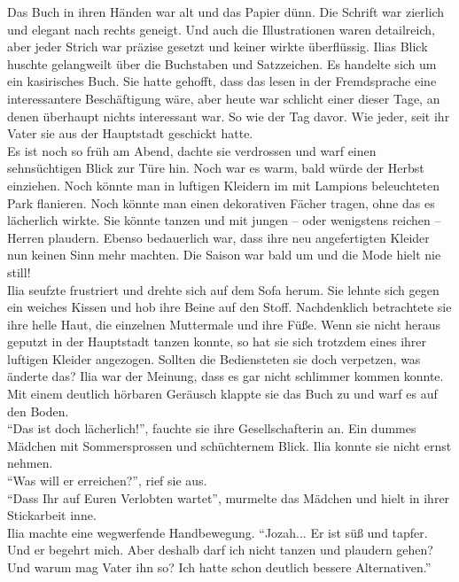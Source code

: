Das Buch in ihren Händen war alt und das Papier dünn. Die Schrift war zierlich 
und elegant nach rechts geneigt. Und auch die Illustrationen waren detailreich, 
aber jeder Strich war präzise gesetzt und keiner wirkte überflüssig. Ilias 
Blick huschte gelangweilt über die Buchstaben und Satzzeichen. Es handelte sich 
um ein kasirisches Buch. Sie hatte gehofft, dass das lesen in der Fremdsprache 
eine interessantere Beschäftigung wäre, aber heute war schlicht einer dieser 
Tage, an denen überhaupt nichts interessant war. So wie der Tag davor. Wie 
jeder, seit ihr Vater sie aus der Hauptstadt geschickt hatte. \\
Es ist noch so früh am Abend, dachte sie verdrossen und warf einen 
sehnsüchtigen Blick zur Türe hin. Noch war es warm, bald würde der Herbst 
einziehen. Noch könnte man in luftigen Kleidern im mit Lampions beleuchteten 
Park flanieren. Noch könnte man einen dekorativen Fächer tragen, ohne das es 
lächerlich wirkte. Sie könnte tanzen und mit jungen – oder wenigstens reichen – 
Herren plaudern. Ebenso bedauerlich war, dass ihre neu angefertigten Kleider nun 
keinen Sinn mehr machten. Die Saison war bald um und die Mode hielt nie still! 
\\
Ilia seufzte frustriert und drehte sich auf dem Sofa herum. Sie lehnte sich 
gegen ein weiches Kissen und hob ihre Beine auf den Stoff. Nachdenklich 
betrachtete sie ihre helle Haut, die einzelnen Muttermale und ihre Füße. Wenn 
sie nicht heraus geputzt in der Hauptstadt tanzen konnte, so hat sie sich 
trotzdem eines ihrer luftigen Kleider angezogen. Sollten die Bediensteten sie 
doch verpetzen, was änderte das? Ilia war der Meinung, dass es gar nicht 
schlimmer kommen konnte. \\
Mit einem deutlich hörbaren Geräusch klappte sie das Buch zu und warf es auf 
den Boden. \\
``Das ist doch lächerlich!'', fauchte sie ihre Gesellschafterin an. Ein dummes 
Mädchen mit Sommersprossen und schüchternem Blick. Ilia konnte sie nicht ernst 
nehmen. \\
``Was will er erreichen?'', rief sie aus. \\
``Dass Ihr auf Euren Verlobten wartet'', murmelte das Mädchen und hielt in ihrer 
Stickarbeit inne. \\
Ilia machte eine wegwerfende Handbewegung. ``Jozah... Er ist süß und tapfer. Und 
er begehrt mich. Aber deshalb darf ich nicht tanzen und plaudern gehen? Und 
warum mag Vater ihn so? Ich hatte schon deutlich bessere Alternativen.'' \\
